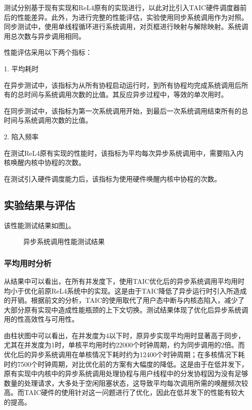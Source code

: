 测试分别基于现有实现和ReL4原有的实现进行，以此对比引入TAIC硬件调度器前后的性能差异。此外，为进行完整的性能评估，实验使用同步系统调用作为对照。同步测试中，使用单线程循环进行系统调用，对页框进行映射与解除映射。系统调用总次数与异步调用相同。

性能评估采用以下两个指标：

1. 平均耗时

在异步测试中，该指标为从所有协程启动运行时，到所有协程均完成系统调用后所有的总时间与系统调用次数的比值。其反应异步过程中，等效的单次用时。

在同步测试中，该指标为第一次系统调用开始，到最后一次系统调用结束所有的总时间与系统调用次数的比值。

2. 陷入频率

在测试ReL4原有实现的性能时，该指标为平均每次异步系统调用中，需要陷入内核唤醒内核中协程的次数。

在测试引入硬件调度能力后，该指标为使用硬件唤醒内核中协程的次数。


\subsection{实验结果与评估}

该性能测试结果如图\ref{性能测试结果}。

\begin{figure}[htbp]
  \centering
  
  \caption{异步系统调用性能测试结果}\label{性能测试结果}
\end{figure}


\subsubsection{平均用时分析}

从结果中可以看出，在所有并发度下，使用TAIC优化后的异步系统调用平均用时均小于优化前原ReL4系统中的实现。这是由于TAIC降低了异步运行时引入所造成的开销。根据前文的分析，TAIC的使用取代了用户态中断与内核态陷入，减少了大部分原有实现中造成性能瓶颈的上下文切换。测试结果体现了优化后异步系统调用的性高效性与可用性。

由柱状图中可以看出，在并发度为4以下时，原异步实现平均用时显著高于同步，尤其在并发度为1时，单核平均用时约22000个时钟周期，约为同步调用的2倍。而优化后的异步系统调用在单核情况下耗时约为12400个时钟周期；在多核情况下耗时约7500个时钟周期，对比优化前的方案有大幅度的降低。这是由于在低并发下，原有实现中内核中的异步系统调用处理协程与用户线程中的分发协程因为没有足够数量的处理请求，大多处于空闲阻塞状态，这导致平均每次调用所需的唤醒频次较高。而TAIC硬件的使用针对这一问题进行了优化，因此在低并发下的性能有较大的提高。

